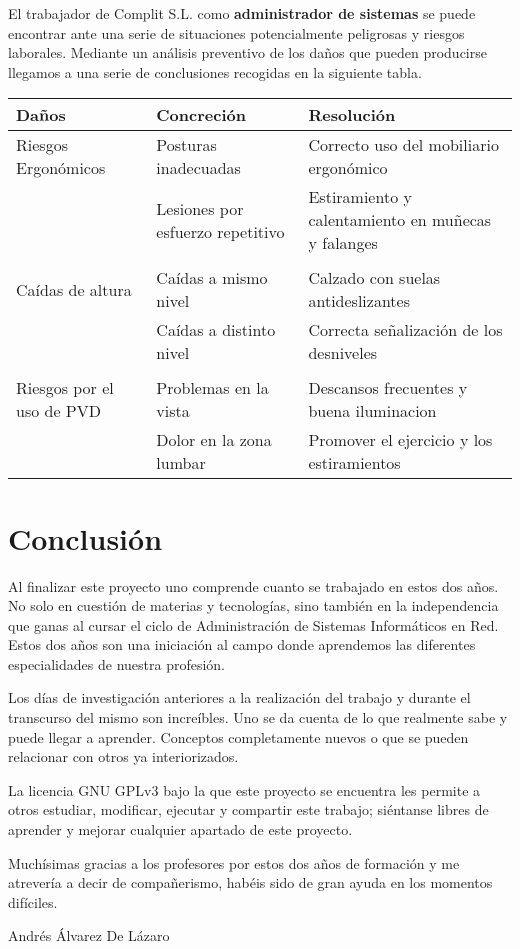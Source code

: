 \documentclass[11pt]{article}
\begin{document}
El trabajador de Complit S.L. como \textbf{administrador de sistemas} se puede encontrar ante una serie de situaciones potencialmente peligrosas y riesgos laborales. Mediante un análisis preventivo de los daños que pueden producirse llegamos a una serie de conclusiones recogidas en la siguiente tabla.

\begin{adjustbox}{width={\textwidth},keepaspectratio}
\centering

\begin{center}
\begin{tabular}{lll}
Daños & Concreción & Resolución\\
\hline
Riesgos Ergonómicos & Posturas inadecuadas & Correcto uso del mobiliario ergonómico\\
 & Lesiones por esfuerzo repetitivo & Estiramiento y calentamiento en muñecas y falanges\\
 &  & \\
Caídas de altura & Caídas a mismo nivel & Calzado con suelas antideslizantes\\
 & Caídas a distinto nivel & Correcta señalización de los desniveles\\
 &  & \\
Riesgos por el uso de PVD & Problemas en la vista & Descansos frecuentes y buena iluminacion\\
 & Dolor en la zona lumbar & Promover el ejercicio y los estiramientos\\
\end{tabular}
\end{center}
\end{adjustbox}

\newpage

\section{Conclusión}
\label{sec:orgfa6f30d}
Al finalizar este proyecto uno comprende cuanto se trabajado en estos dos años. No solo en cuestión de materias y tecnologías, sino también en la independencia que ganas al cursar el ciclo de Administración de Sistemas Informáticos en Red. Estos dos años son una iniciación al campo donde aprendemos las diferentes especialidades de nuestra profesión.

Los días de investigación anteriores a la realización del trabajo y durante el transcurso del mismo son increíbles. Uno se da cuenta de lo que realmente sabe y puede llegar a aprender. Conceptos completamente nuevos o que se pueden relacionar con otros ya interiorizados.

La licencia GNU GPLv3 bajo la que este proyecto se encuentra les permite a otros estudiar, modificar, ejecutar y compartir este trabajo; siéntanse libres de aprender y mejorar cualquier apartado de este proyecto.

Muchísimas gracias a los profesores por estos dos años de formación y me atrevería a decir de compañerismo, habéis sido de gran ayuda en los momentos difíciles.

Andrés Álvarez De Lázaro

\newpage



\end{document}
